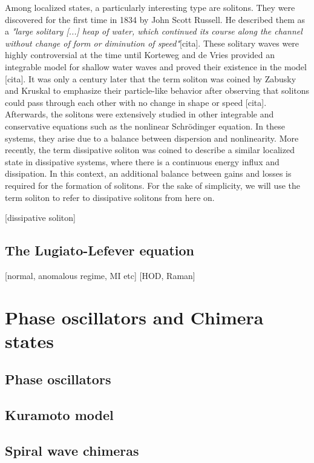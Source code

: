 Among localized states, a particularly interesting type are solitons. They were discovered
 for the first time in 1834 by John Scott Russell. He described them 
 as a {\em "large solitary [...] heap of water, which continued its course along the channel without change of form
or diminution of speed"}[cita]. These solitary waves were highly controversial
at the time until Korteweg and de Vries provided an integrable model for shallow water waves
and proved their existence in the model [cita].
It was only a century later that the term soliton was coined by Zabusky and Kruskal
to emphasize their particle-like behavior after observing that solitons could pass through each
other with no change in shape or speed [cita]. Afterwards, the solitons were extensively studied
in other integrable and conservative equations such as the nonlinear Schrödinger
equation. In these systems, they arise due to a balance between dispersion and nonlinearity. 
More recently, the term dissipative soliton was coined to describe a similar localized state
in dissipative systems, where there is a continuous energy influx and dissipation. 
In this context, an additional balance between gains and losses is required for the formation
of solitons. For the sake of simplicity, we will use the term soliton to refer to dissipative
solitons from here on.


[dissipative soliton]

\subsection{The Lugiato-Lefever equation}

[normal, anomalous regime, MI etc]
[HOD, Raman]

\section{Phase oscillators and Chimera states}
\subsection{Phase oscillators}
\label{sec:phase_oscillators}

\subsection{Kuramoto model}

\subsection{Spiral wave chimeras}